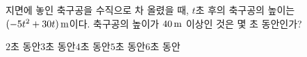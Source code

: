 지면에 놓인 축구공을 수직으로 차 올렸을 때, $t$초 후의 축구공의 높이는 $(-5t^2+30t)\mkern3mu \mathrm{m}$이다. 축구공의 높이가 $40\mkern3mu \mathrm{m}$ 이상인 것은 몇 초 동안인가?
\begin{choices32}{$2$초 동안}{$3$초 동안}{$4$초 동안}{$5$초 동안}{$6$초 동안}\end{choices32}
